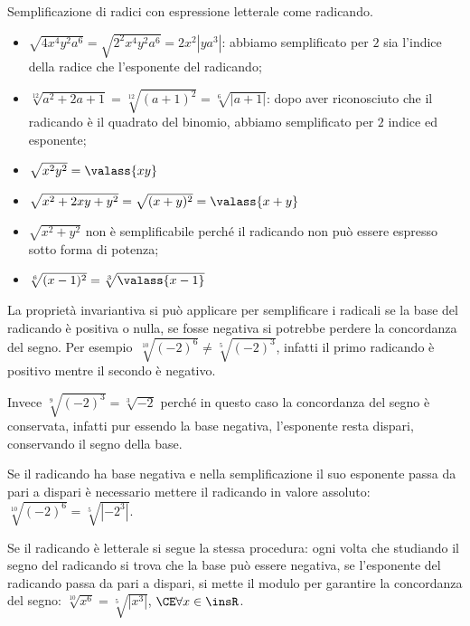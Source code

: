 \begin{exrig}
 \begin{esempio}
Semplificazione di radici con espressione letterale come radicando.
\begin{itemize}
\item $\sqrt{4x^4y^2a^6}=\sqrt{2^2x^4y^2a^6}=2x^2\left|ya^3\right|$: 
 abbiamo semplificato per $2$ sia l'indice della radice che l'esponente del 
 radicando;
\item $\sqrt[12]{a^2+2a+1}=\sqrt[12]{(a+1)^2}=\sqrt[6]{\left|a+1\right|}$: 
 dopo aver riconosciuto che il radicando è il quadrato del binomio, 
 abbiamo semplificato per $2$ indice ed esponente;
\item $\sqrt{x^2y^2}=\valass{xy}$
\item $\sqrt{x^2+2xy+y^2}=\sqrt{(x+y)^2}=\valass{x+y}$
\item $\sqrt{x^2+y^2}$ non è semplificabile perché il radicando non può essere 
 espresso sotto forma di potenza;
\item $\sqrt[6]{(x-1)^2}=\sqrt[3]{\valass{x-1}}$
\end{itemize}
 \end{esempio}
\end{exrig}

La proprietà invariantiva si può applicare per semplificare i radicali se la 
base del radicando è positiva o nulla, se fosse negativa si potrebbe perdere 
la concordanza del segno. 
Per esempio~$\sqrt[10]{(-2)^6}\neq \sqrt[5]{(-2)^3}$, infatti il primo 
radicando è positivo mentre il secondo è negativo.

Invece $\sqrt[9]{(-2)^3}=\sqrt[3]{-2}$ perché in questo caso la concordanza 
del segno è conservata, infatti pur essendo la base negativa, l'esponente 
resta dispari, conservando il segno della base.

Se il radicando ha base negativa e nella semplificazione il suo esponente 
passa da pari a dispari è necessario mettere il radicando in valore assoluto: 
$\sqrt[10]{(-2)^6}=\sqrt[5]{\left|-2^3\right|}$.

Se il radicando è letterale si segue la stessa procedura: ogni volta che 
studiando il segno del radicando si trova che la base può essere negativa, 
se l'esponente del radicando passa da pari a dispari, si mette il modulo per 
garantire la concordanza del segno:
$\sqrt[10]{x^6}=\sqrt[5]{\left|x^3\right|}$, $\CE \forall x \in \insR$.


